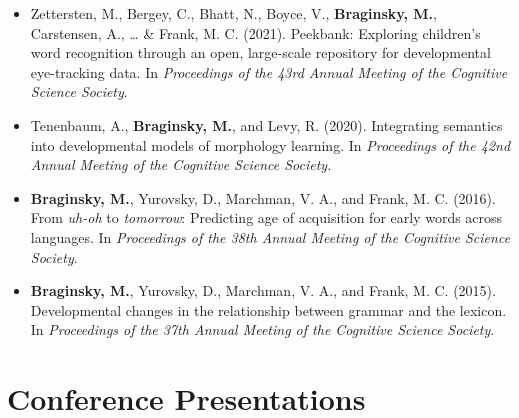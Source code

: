 \documentclass[11pt,]{article}
\begin{document}
\begin{itemize}
\item
  Zettersten, M., Bergey, C., Bhatt, N., Boyce, V., \textbf{Braginsky,
  M.}, Carstensen, A., \ldots{} \& Frank, M. C. (2021). Peekbank:
  Exploring children's word recognition through an open, large-scale
  repository for developmental eye-tracking data. In \emph{Proceedings
  of the 43rd Annual Meeting of the Cognitive Science Society}.
\item
  Tenenbaum, A., \textbf{Braginsky, M.}, and Levy, R. (2020).
  Integrating semantics into developmental models of morphology
  learning. In \emph{Proceedings of the 42nd Annual Meeting of the
  Cognitive Science Society}.
\item
  \textbf{Braginsky, M.}, Yurovsky, D., Marchman, V. A., and Frank, M.
  C. (2016). From \emph{uh-oh} to \emph{tomorrow}: Predicting age of
  acquisition for early words across languages. In \emph{Proceedings of
  the 38th Annual Meeting of the Cognitive Science Society}.
\item
  \textbf{Braginsky, M.}, Yurovsky, D., Marchman, V. A., and Frank, M.
  C. (2015). Developmental changes in the relationship between grammar
  and the lexicon. In \emph{Proceedings of the 37th Annual Meeting of
  the Cognitive Science Society}.
\end{itemize}

\hypertarget{conference-presentations}{%
\section{Conference Presentations}\label{conference-presentations}}
\end{document}
